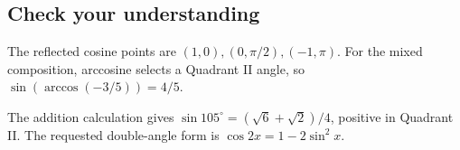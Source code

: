 \hypertarget{m4-check-your-understanding}{%
\subsection{Check your understanding}\label{m4-check-your-understanding}}

The reflected cosine points are \((1,0),(0,\pi/2),(-1,\pi)\). For the mixed composition, arccosine selects a Quadrant II angle, so \(\sin(\arccos(-3/5))=4/5\).

The addition calculation gives \(\sin105^\circ=(\sqrt6+\sqrt2)/4\), positive in Quadrant II. The requested double-angle form is \(\cos2x=1-2\sin^2x\).

\clearpage
